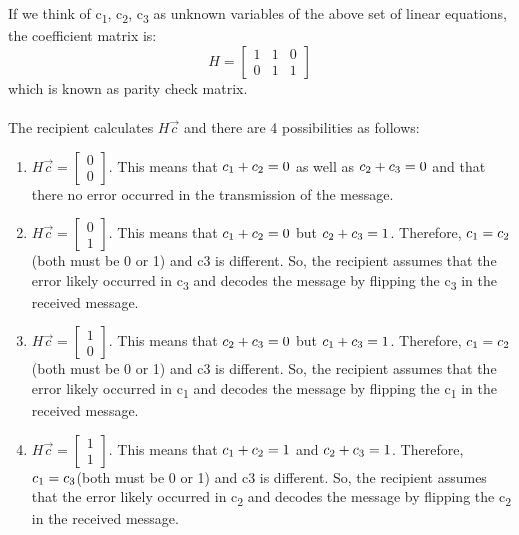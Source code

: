 \documentclass[11pt,a4paper]{article}
\begin{document}
If we think of c\textsubscript{1}, c\textsubscript{2}, c\textsubscript{3} as unknown variables of the above set of linear equations, the coefficient matrix is:
$$
H = 
\begin{bmatrix}
    1 & 1 & 0\\
    0 & 1 & 1
\end{bmatrix}
$$
which is known as parity check matrix. 

\paragraph{}
The recipient calculates $H\Vec{c}$ and there are 4 possibilities as follows:
\begin{enumerate}
    \item $H\Vec{c} = \begin{bmatrix} 0\\0 \end{bmatrix}$. This means that $c\textsubscript{1} + c\textsubscript{2} = 0$ as well as $c\textsubscript{2} + c\textsubscript{3} = 0$ and that there no error occurred in the transmission of the message.
    
    \item $H\Vec{c} = \begin{bmatrix} 0\\1 \end{bmatrix}$. This means that $c\textsubscript{1} + c\textsubscript{2} = 0$ but $c\textsubscript{2} + c\textsubscript{3} = 1$. Therefore, $c\textsubscript{1} = c\textsubscript{2}$(both must be 0 or 1) and c3 is different. So, the recipient assumes that the error likely occurred in c\textsubscript{3} and decodes the message by flipping the c\textsubscript{3} in the received message.
    
    \item $H\Vec{c} = \begin{bmatrix} 1\\0 \end{bmatrix}$. This means that $c\textsubscript{2} + c\textsubscript{3} = 0$ but $c\textsubscript{1} + c\textsubscript{3} = 1$. Therefore, $c\textsubscript{1} = c\textsubscript{2}$(both must be 0 or 1) and c3 is different. So, the recipient assumes that the error likely occurred in c\textsubscript{1} and decodes the message by flipping the c\textsubscript{1} in the received message.
    
    \item $H\Vec{c} = \begin{bmatrix} 1\\1 \end{bmatrix}$. This means that $c\textsubscript{1} + c\textsubscript{2} = 1$ and $c\textsubscript{2} + c\textsubscript{3} = 1$. Therefore, $c\textsubscript{1} = c\textsubscript{3}$(both must be 0 or 1) and c3 is different. So, the recipient assumes that the error likely occurred in c\textsubscript{2} and decodes the message by flipping the c\textsubscript{2} in the received message.
\end{enumerate}
\end{document}
